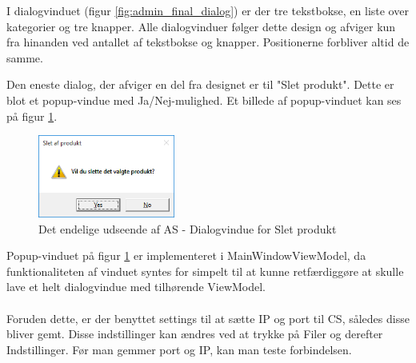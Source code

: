 I dialogvinduet (figur \ref{fig:admin_final_dialog}) er der tre tekstbokse, en liste over kategorier og tre knapper. Alle dialogvinduer følger dette design og afviger kun fra hinanden ved antallet af tekstbokse og knapper. Positionerne forbliver altid de samme.

Den eneste dialog, der afviger en del fra designet er til "Slet produkt". Dette er blot et popup-vindue med Ja/Nej-mulighed. Et billede af popup-vinduet kan ses på figur \ref{fig:admin_final_sletprodukt}.

\begin{figure}[H]
	\centering
	\includegraphics[width=0.4\textwidth]{Systemdesign/backend/Images/AdminDesignSletProdukt}
	\caption{Det endelige udseende af \gls{AS} - Dialogvindue for Slet produkt}
	\label{fig:admin_final_sletprodukt}
\end{figure}

Popup-vinduet på figur \ref{fig:admin_final_sletprodukt} er implementeret i MainWindowViewModel, da funktionaliteten af vinduet syntes for simpelt til at kunne retfærdiggøre at skulle lave et helt dialogvindue med tilhørende ViewModel.\\\\
Foruden dette, er der benyttet settings til at sætte IP og port til \gls{CS}, således disse bliver gemt. Disse indstillinger kan ændres ved at trykke på Filer og derefter Indstillinger. Før man gemmer port og IP, kan man teste forbindelsen.